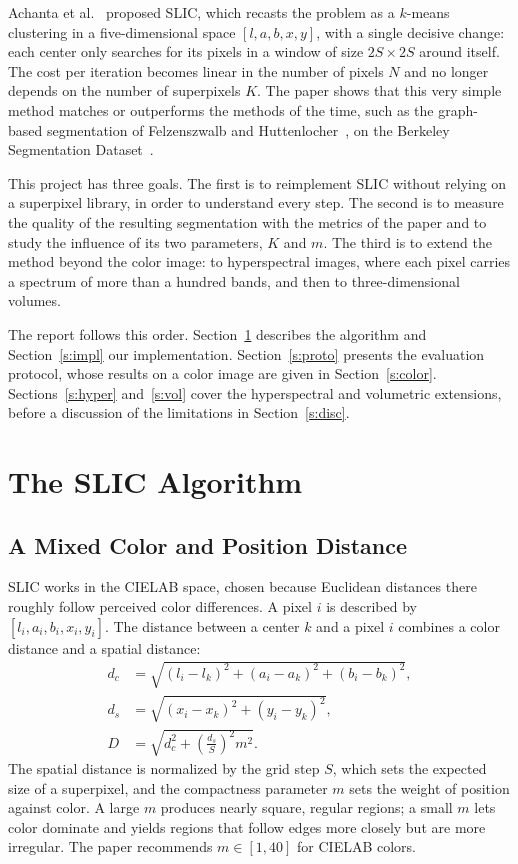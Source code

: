 Achanta et al.~\cite{achanta} proposed SLIC, which recasts
the problem as a $k$-means clustering
in a five-dimensional space $[l, a, b, x, y]$, with a
single decisive change: each center only searches for its
pixels in a window of size $2S \times 2S$ around itself. The cost per iteration becomes linear in the number of
pixels $N$ and no longer depends on the number of superpixels $K$.
The paper shows that this very simple method matches or
outperforms the methods of the time, such as the graph-based segmentation
of Felzenszwalb and Huttenlocher~\cite{felzenszwalb}, on the
Berkeley Segmentation Dataset~\cite{martin}.

This project has three goals. The first is to
reimplement SLIC without relying on a superpixel library, in order to understand every step. The second
is to measure the quality of the resulting segmentation with
the metrics of the paper and to study the influence of its
two parameters, $K$ and $m$. The third is to extend the
method beyond the color image: to hyperspectral images, where each pixel carries a spectrum of more than
a hundred bands, and then to three-dimensional volumes.

The report follows this order. Section~\ref{s:algo} describes the algorithm and Section~\ref{s:impl} our implementation. Section~\ref{s:proto}
presents the evaluation protocol, whose results on a
color image are given in Section~\ref{s:color}. Sections~\ref{s:hyper} and~\ref{s:vol}
cover the hyperspectral and volumetric extensions, before
a discussion of the limitations in Section~\ref{s:disc}.

\section{The SLIC Algorithm}\label{s:algo}
\subsection{A Mixed Color and Position Distance}
SLIC works in the CIELAB space, chosen because
Euclidean distances there roughly follow perceived color differences.
A pixel $i$ is described by $[l_i, a_i, b_i, x_i, y_i]$.
The distance between a center $k$ and a pixel $i$ combines a
color distance and a spatial distance:
\begin{align}
d_c &= \sqrt{(l_i - l_k)^2 + (a_i - a_k)^2 + (b_i - b_k)^2},\\
d_s &= \sqrt{(x_i - x_k)^2 + (y_i - y_k)^2},\\
D &= \sqrt{d_c^2 + \left(\frac{d_s}{S}\right)^{2} m^2}.\label{e:D}
\end{align}
The spatial distance is normalized by the grid step $S$,
which sets the expected size of a superpixel, and the compactness parameter
$m$ sets the weight of position against
color. A large $m$ produces nearly square,
regular regions; a small $m$ lets color dominate and
yields regions that follow edges more closely but are
more irregular. The paper recommends $m \in [1, 40]$ for CIELAB colors.

